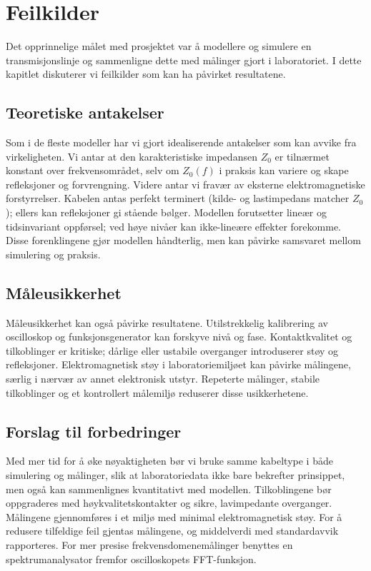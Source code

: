 \section{Feilkilder}
Det opprinnelige målet med prosjektet var å modellere og simulere en transmisjonslinje og sammenligne dette med målinger gjort i laboratoriet. I dette kapitlet diskuterer vi feilkilder som kan ha påvirket resultatene.

\subsection{Teoretiske antakelser}
Som i de fleste modeller har vi gjort idealiserende antakelser som kan avvike fra virkeligheten. Vi antar at den karakteristiske impedansen $Z_0$ er tilnærmet konstant over frekvensområdet, selv om $Z_0(f)$ i praksis kan variere og skape refleksjoner og forvrengning. Videre antar vi fravær av eksterne elektromagnetiske forstyrrelser. Kabelen antas perfekt terminert (kilde- og lastimpedans matcher $Z_0$); ellers kan refleksjoner gi stående bølger. Modellen forutsetter lineær og tidsinvariant oppførsel; ved høye nivåer kan ikke-lineære effekter forekomme. Disse forenklingene gjør modellen håndterlig, men kan påvirke samsvaret mellom simulering og praksis.

\subsection{Måleusikkerhet}
Måleusikkerhet kan også påvirke resultatene. Utilstrekkelig kalibrering av oscilloskop og funksjonsgenerator kan forskyve nivå og fase. Kontaktkvalitet og tilkoblinger er kritiske; dårlige eller ustabile overganger introduserer støy og refleksjoner. Elektromagnetisk støy i laboratoriemiljøet kan påvirke målingene, særlig i nærvær av annet elektronisk utstyr. Repeterte målinger, stabile tilkoblinger og et kontrollert målemiljø reduserer disse usikkerhetene.

\subsection{Forslag til forbedringer}
Med mer tid for å øke nøyaktigheten bør vi bruke samme kabeltype i både simulering og målinger, slik at laboratoriedata ikke bare bekrefter prinsippet, men også kan sammenlignes kvantitativt med modellen. Tilkoblingene bør oppgraderes med høykvalitetskontakter og sikre, lavimpedante overganger. Målingene gjennomføres i et miljø med minimal elektromagnetisk støy. For å redusere tilfeldige feil gjentas målingene, og middelverdi med standardavvik rapporteres. For mer presise frekvensdomenemålinger benyttes en spektrumanalysator fremfor oscilloskopets FFT-funksjon.
